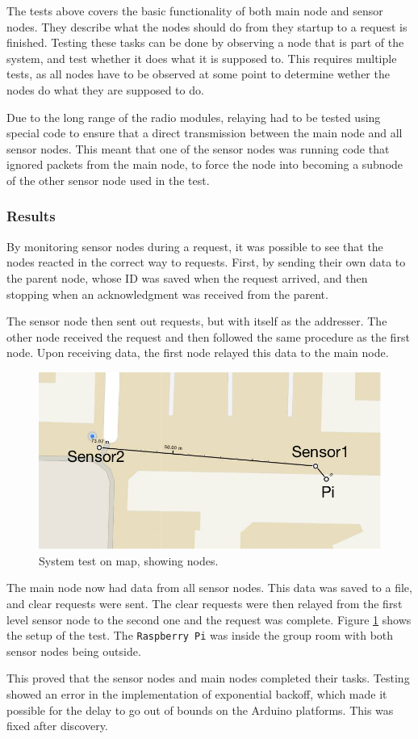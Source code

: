 The tests above covers the basic functionality of both main node and sensor nodes. They describe what the nodes should do from they startup to a request is finished.
Testing these tasks can be done by observing a node that is part of the system, and test whether it does what it is supposed to. This requires multiple tests, as all nodes have to be observed at some point to determine wether the nodes do what they are supposed to do.

Due to the long range of the radio modules, relaying had to be tested using special code to ensure that a direct transmission between the main node and all sensor nodes. This meant that one of the sensor nodes was running code that ignored packets from the main node, to force the node into becoming a subnode of the other sensor node used in the test.

\subsubsection*{Results}
By monitoring sensor nodes during a request, it was possible to see that the nodes reacted in the correct way to requests. First, by sending their own data to the parent node, whose ID was saved when the request arrived, and then stopping when an acknowledgment was received from the parent.

The sensor node then sent out requests, but with itself as the addresser. The other node received the request and then followed the same procedure as the first node. Upon receiving data, the first node relayed this data to the main node.

\begin{figure}[h!]
\centering
\includegraphics[width=1\textwidth]{chapters/test/figures/systest.png}
\caption{System test on map, showing nodes.}
\label{fig:systest}
\end{figure}

The main node now had data from all sensor nodes. This data was saved to a file, and clear requests were sent. The clear requests were then relayed from the first level sensor node to the second one and the request was complete. Figure \ref{fig:systest} shows the setup of the test. The \texttt{Raspberry Pi} was inside the group room with both sensor nodes being outside.

This proved that the sensor nodes and main nodes completed their tasks. Testing showed an error in the implementation of exponential backoff, which made it possible for the delay to go out of bounds on the Arduino platforms. This was fixed after discovery.


